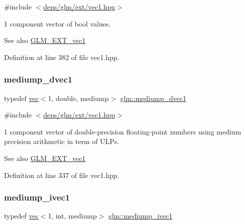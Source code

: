 {\ttfamily \#include $<$\hyperlink{ext_2vec1_8hpp}{deps/glm/ext/vec1.\+hpp}$>$}

1 component vector of bool values.

\begin{DoxySeeAlso}{See also}
\hyperlink{group__ext__vec1}{G\+L\+M\+\_\+\+E\+X\+T\+\_\+vec1} 
\end{DoxySeeAlso}


Definition at line 382 of file vec1.\+hpp.

\mbox{\label{group__ext__vec1_gabfbd2538da41381bc96ee634944b9a28}} 
\subsubsection{\texorpdfstring{mediump\+\_\+dvec1}{mediump\_dvec1}}
{\footnotesize\ttfamily typedef \hyperlink{structglm_1_1vec}{vec}$<$1, double, mediump$>$ \hyperlink{group__ext__vec1_gabfbd2538da41381bc96ee634944b9a28}{glm\+::mediump\+\_\+dvec1}}



{\ttfamily \#include $<$\hyperlink{ext_2vec1_8hpp}{deps/glm/ext/vec1.\+hpp}$>$}

1 component vector of double-\/precision floating-\/point numbers using medium precision arithmetic in term of U\+L\+Ps.

\begin{DoxySeeAlso}{See also}
\hyperlink{group__ext__vec1}{G\+L\+M\+\_\+\+E\+X\+T\+\_\+vec1} 
\end{DoxySeeAlso}


Definition at line 337 of file vec1.\+hpp.

\mbox{\label{group__ext__vec1_gaa3adbc518fe07a292115c7662327effc}} 
\subsubsection{\texorpdfstring{mediump\+\_\+ivec1}{mediump\_ivec1}}
{\footnotesize\ttfamily typedef \hyperlink{structglm_1_1vec}{vec}$<$1, int, mediump$>$ \hyperlink{group__ext__vec1_gaa3adbc518fe07a292115c7662327effc}{glm\+::mediump\+\_\+ivec1}}




